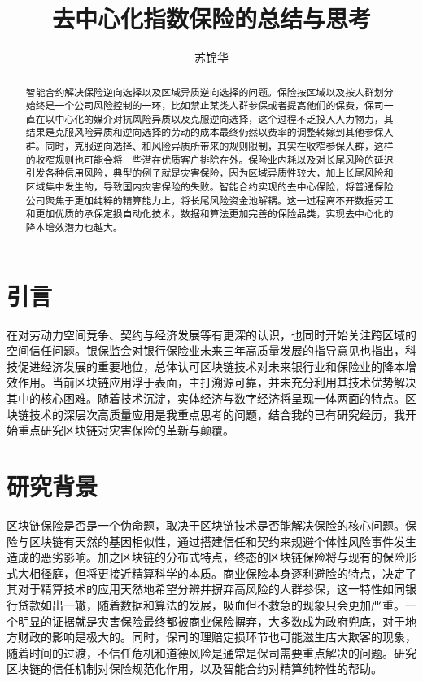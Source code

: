 \documentclass{ctexart}
\title{去中心化指数保险的总结与思考}
\author{苏锦华}
\begin{document}
\maketitle

\begin{abstract}
      智能合约解决保险逆向选择以及区域异质逆向选择的问题。保险按区域以及按人群划分始终是一个公司风险控制的一环，比如禁止某类人群参保或者提高他们的保费，保司一直在以中心化的媒介对抗风险异质以及克服逆向选择，这个过程不乏投入人力物力，其结果是克服风险异质和逆向选择的劳动的成本最终仍然以费率的调整转嫁到其他参保人群。同时，克服逆向选择、和风险异质所带来的规则限制，其实在收窄参保人群，这样的收窄规则也可能会将一些潜在优质客户排除在外。保险业内耗以及对长尾风险的延迟引发各种信用风险，典型的例子就是灾害保险，因为区域异质性较大，加上长尾风险和区域集中发生的，导致国内灾害保险的失败。智能合约实现的去中心保险，将普通保险公司聚焦于更加纯粹的精算能力上，将长尾风险资金池解耦。这一过程离不开数据劳工和更加优质的承保定损自动化技术，数据和算法更加完善的保险品类，实现去中心化的降本增效潜力也越大。
\end{abstract}

\section{引言}

在对劳动力空间竞争、契约与经济发展等有更深的认识，也同时开始关注跨区域的空间信任问题。银保监会对银行保险业未来三年高质量发展的指导意见也指出，科技促进经济发展的重要地位，总体认可区块链技术对未来银行业和保险业的降本增效作用。当前区块链应用浮于表面，主打溯源可靠，并未充分利用其技术优势解决其中的核心困难。随着技术沉淀，实体经济与数字经济将呈现一体两面的特点。区块链技术的深层次高质量应用是我重点思考的问题，结合我的已有研究经历，我开始重点研究区块链对灾害保险的革新与颠覆。

\section{研究背景}

区块链保险是否是一个伪命题，取决于区块链技术是否能解决保险的核心问题。保险与区块链有天然的基因相似性，通过搭建信任和契约来规避个体性风险事件发生造成的恶劣影响。加之区块链的分布式特点，终态的区块链保险将与现有的保险形式大相径庭，但将更接近精算科学的本质。商业保险本身逐利避险的特点，决定了其对于精算技术的应用天然地希望分辨并摒弃高风险的人群参保，这一特性如同银行贷款如出一辙，随着数据和算法的发展，吸血但不救急的现象只会更加严重。一个明显的证据就是灾害保险最终都被商业保险摒弃，大多数成为政府兜底，对于地方财政的影响是极大的。同时，保司的理赔定损环节也可能滋生店大欺客的现象，随着时间的过渡，不信任危机和道德风险是通常是保司需要重点解决的问题。研究区块链的信任机制对保险规范化作用，以及智能合约对精算纯粹性的帮助。
\end{document}

